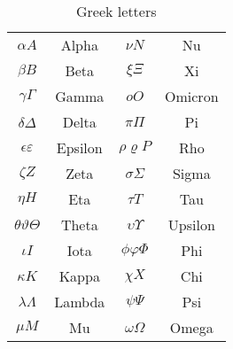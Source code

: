 \documentclass{article}
\begin{document}
\bgroup
\def\arraystretch{2}
\begin{table}[hbp]
  \centering
  \begin{tabular}{cccc}
  \hline
  	$\alpha A$				& Alpha		& $\nu N$		& Nu	\\
  	$\beta B$				& Beta		& $\xi \Xi$	&  Xi 		\\
  	$\gamma \Gamma$			& Gamma		& $o O$	& Omicron		\\
	$\delta \Delta$			& Delta 	& $\pi \Pi$	& Pi		\\
	$\epsilon \varepsilon $	& Epsilon	& $\rho\varrho P$ & Rho   \\
	$\zeta Z$				& Zeta		& $\sigma \Sigma$& Sigma  	\\
	$\eta H$				& Eta		& $\tau T$	& Tau  		\\  
	$\theta \vartheta \Theta$	& Theta & $\upsilon \Upsilon$ & Upsilon  \\
	$\iota I$				& Iota		& $\phi \varphi \Phi$ & Phi    \\
	$\kappa K$				& Kappa		& $\chi X$	& Chi  		\\
	$\lambda \Lambda$		& Lambda	& $\psi \Psi$	& Psi  	\\
	$\mu M$					& Mu 		& $\omega \Omega$ & Omega   \\
  
  \hline
  \end{tabular}
  \caption{Greek letters}
  \label{tab:symbol-variants}
\end{table}
\egroup
\end{document}
